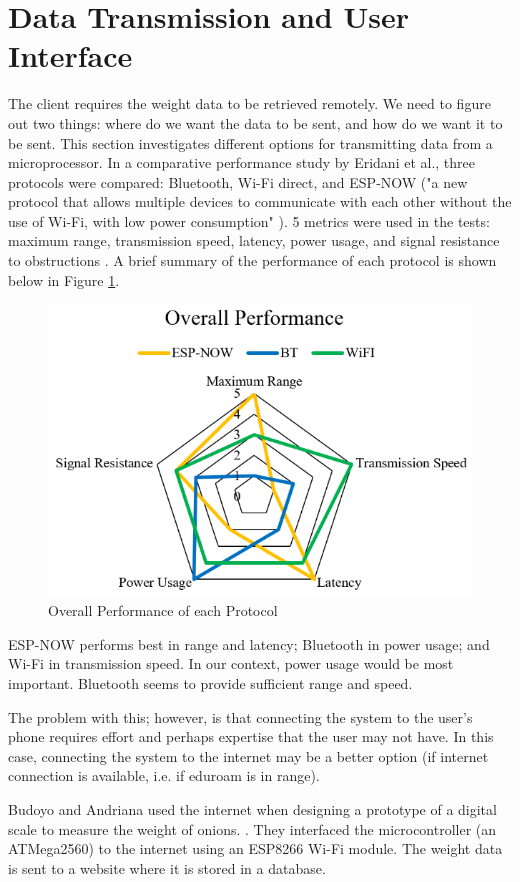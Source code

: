 \documentclass[class=report,11pt,crop=false]{standalone}
\begin{document}
\section{Data Transmission and User Interface}
The client requires the weight data to be retrieved remotely. We need to figure out two things: where do we want the data to be sent, and how do we want it to be sent.
This section investigates different options for transmitting data from a microprocessor. In a comparative performance study by Eridani et al., three protocols were compared: Bluetooth, Wi-Fi direct, and ESP-NOW ("a new protocol that allows multiple devices to communicate with each other without the use of Wi-Fi, with low power consumption" \cite{comparitiveEspnow}). 5 metrics were used in the tests: maximum range, transmission speed, latency, power usage, and signal resistance to obstructions \cite{comparitiveEspnow}. A brief summary of the performance of each protocol is shown below in Figure \ref{fig:performance}.
\begin{figure}[h]
	\centering
	\includegraphics[width=0.7\linewidth]{Figures/performance}
	\caption{Overall Performance of each Protocol \cite{comparitiveEspnow}}
	\label{fig:performance}
\end{figure}

ESP-NOW performs best in range and latency; Bluetooth in power usage; and Wi-Fi in transmission speed. In our context, power usage would be most important. Bluetooth seems to provide sufficient range and speed.

The problem with this; however, is that connecting the system to the user's phone requires effort and perhaps expertise that the user may not have. In this case, connecting the system to the internet may be a better option (if internet connection is available, i.e. if eduroam is in range). 

Budoyo and Andriana used the internet when designing a prototype of a digital scale to measure the weight of onions. \cite{iot}. They interfaced the microcontroller (an  ATMega2560) to the internet using an ESP8266 Wi-Fi module. The weight data is sent to a website where it is stored in a database.
\end{document}
